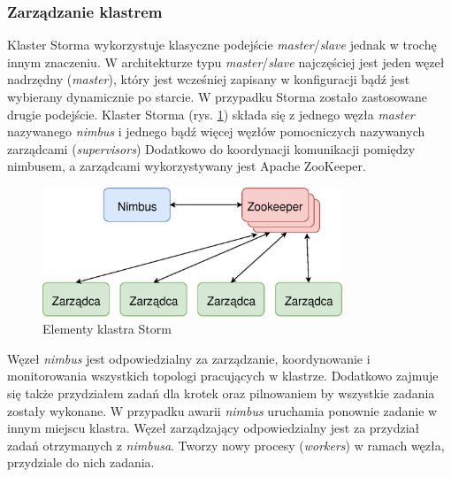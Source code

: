 \subsubsection*{Zarządzanie klastrem}
Klaster Storma wykorzystuje klasyczne podejście \textit{master}/\textit{slave}
jednak w trochę innym znaczeniu.
W architekturze typu \textit{master}/\textit{slave} najczęściej jest jeden węzeł nadrzędny (\textit{master}),
który jest wcześniej zapisany w konfiguracji
bądź jest wybierany dynamicznie po starcie.
W przypadku Storma zostało zastosowane drugie podejście.
Klaster Storma (rys. \ref{fig:StormCluster}) składa się z jednego węzła \textit{master} nazywanego \textit{nimbus}
i jednego bądź więcej węzłów pomocniczych nazywanych zarządcami (\textit{supervisors})
Dodatkowo do koordynacji komunikacji pomiędzy nimbusem,
a zarządcami wykorzystywany jest Apache ZooKeeper.
\begin{figure}[htbp]
  \centering
  \includegraphics[width=0.8\textwidth]{img/stormCluster}
  \caption{Elementy klastra Storm}
  \label{fig:StormCluster}
\end{figure}

Węzeł \textit{nimbus} jest odpowiedzialny za zarządzanie,
koordynowanie i monitorowania wszystkich topologi pracujących w klastrze.
Dodatkowo zajmuje się także przydziałem zadań dla krotek
oraz pilnowaniem by wszystkie zadania zostały wykonane.
W przypadku awarii \textit{nimbus} uruchamia ponownie zadanie w innym miejscu klastra.
Węzeł zarządzający odpowiedzialny jest za przydział zadań otrzymanych z \textit{nimbusa}.
Tworzy nowy procesy (\textit{workers}) w ramach węzła,
przydziale do nich zadania.
